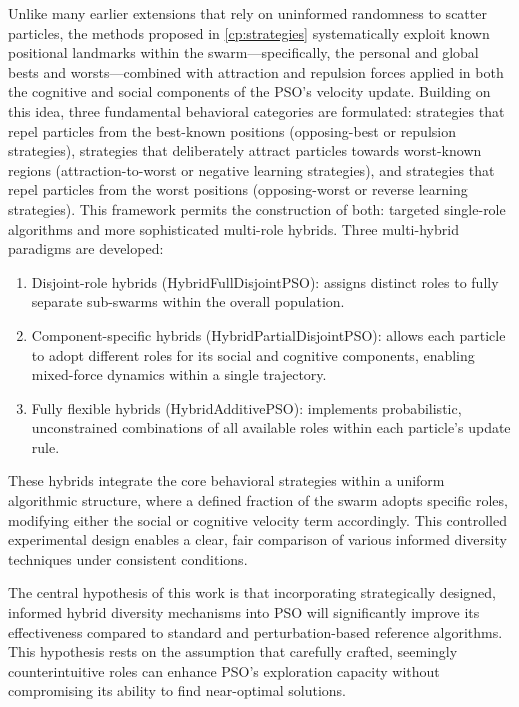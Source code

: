 {%

Unlike many earlier extensions that rely on uninformed randomness to scatter particles, the methods proposed in \autoref{cp:strategies} systematically exploit known positional landmarks within the swarm---specifically, the personal and global bests and worsts---combined with attraction and repulsion forces applied in both the cognitive and social components of the PSO's velocity update. Building on this idea, three fundamental behavioral categories are formulated: strategies that repel particles from the best-known positions (opposing-best or repulsion strategies), strategies that deliberately attract particles towards worst-known regions (attraction-to-worst or negative learning strategies), and strategies that repel particles from the worst positions (opposing-worst or reverse learning strategies). 
This framework permits the construction of both: targeted single-role algorithms and more sophisticated multi-role hybrids. Three multi-hybrid paradigms are developed:
\begin{enumerate}
    \item Disjoint-role hybrids (HybridFullDisjointPSO): assigns distinct roles to fully separate sub-swarms within the overall population.
    \item Component-specific hybrids (HybridPartialDisjointPSO): allows each particle to adopt different roles for its social and cognitive components, enabling mixed-force dynamics within a single trajectory.
    \item Fully flexible hybrids (HybridAdditivePSO): implements probabilistic, unconstrained combinations of all available roles within each particle’s update rule.
\end{enumerate}
These hybrids integrate the core behavioral strategies within a uniform algorithmic structure, where a defined fraction of the swarm adopts specific roles, modifying either the social or cognitive velocity term accordingly. This controlled experimental design enables a clear, fair comparison of various informed diversity techniques under consistent conditions.

The central hypothesis of this work is that incorporating strategically designed, informed hybrid diversity mechanisms into PSO will significantly improve its effectiveness compared to standard and perturbation-based reference algorithms.
This hypothesis rests on the assumption that 
carefully crafted, seemingly counterintuitive roles can enhance PSO's exploration capacity  without compromising its ability to find near-optimal solutions.



}
